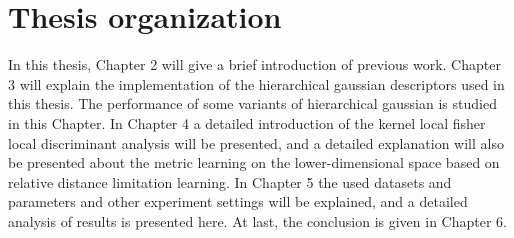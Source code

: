 \section{Thesis organization}
In this thesis, Chapter 2 will give a brief introduction of previous work. Chapter 3 will explain the implementation of the hierarchical gaussian descriptors used in this thesis. The performance of some variants of hierarchical gaussian is studied in this Chapter. In Chapter 4 a detailed introduction of the kernel local fisher local discriminant analysis will be presented, and a detailed explanation will also be presented about the metric learning on the lower-dimensional space based on relative distance limitation learning.
In Chapter 5 the used datasets and parameters and other experiment settings will be explained, and a detailed analysis of results is presented here. At last, the conclusion is given in Chapter 6.




